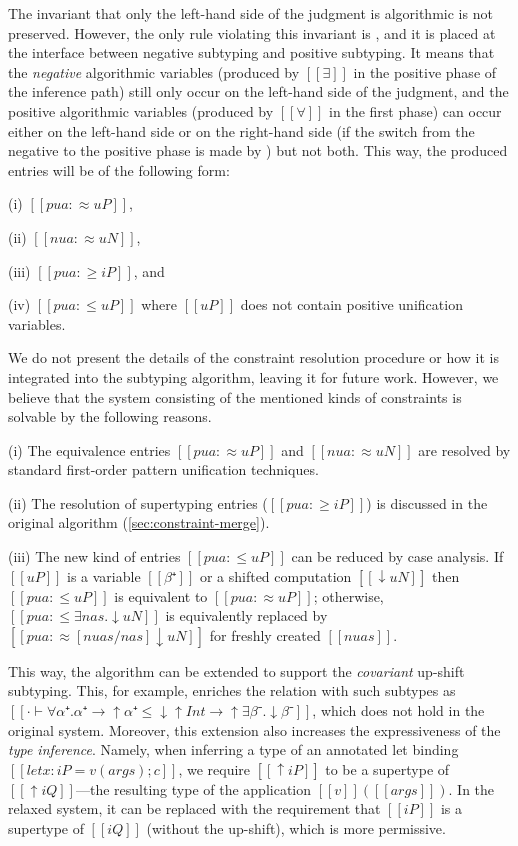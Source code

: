 The invariant that only the left-hand side of the judgment is algorithmic is not
preserved. However, the only rule violating this invariant is
, and it is placed at the interface between
negative subtyping and positive subtyping. It means that the \emph{negative}
algorithmic variables (produced by $[[∃]]$ in the positive phase of the
inference path) still only occur on the left-hand side of the judgment, and the
positive algorithmic variables (produced by $[[∀]]$ in the first phase) can
occur either on the left-hand side or on the right-hand side (if the switch from
the negative to the positive phase is made by )
but not both.
This way, the produced entries will be of the following form:
\begin{itemize*}
    \item[(i)] $[[pua :≈ uP]]$, 
    \item[(ii)] $[[nua :≈ uN]]$, 
    \item[(iii)] $[[pua :≥ iP]]$, and
    \item[(iv)] $[[pua :≤ uP]]$ where $[[uP]]$ does not contain positive unification variables.
\end{itemize*}

We do not present the details of the constraint resolution procedure or how it
is integrated into the subtyping algorithm, leaving it for future work. However,
we believe that the system consisting of the mentioned kinds of constraints is solvable
by the following reasons.
\begin{enumerate*}
    \item[(i)] The equivalence entries $[[pua :≈ uP]]$ and $[[nua :≈ uN]]$ are resolved by standard first-order pattern unification techniques.
    \item[(ii)] The resolution of supertyping entries ($[[pua :≥ iP]]$) is discussed in the original algorithm (\cref{sec:constraint-merge}).
    \item[(iii)] The new kind of entries $[[pua :≤ uP]]$ can be
        reduced by case analysis. If $[[uP]]$ is a variable $[[β⁺]]$
        or a shifted computation $[[↓uN]]$ then 
        $[[pua :≤ uP]]$ is equivalent to $[[pua :≈ uP]]$;
        otherwise, $[[pua :≤ ∃nas.↓uN]]$ is equivalently replaced by $[[pua :≈ [nuas/nas]↓uN]]$
        for freshly created $[[nuas]]$.
\end{enumerate*}

This way, the algorithm can be extended to support the \emph{covariant} up-shift
subtyping. This, for example, enriches the relation with such subtypes as $[[· ⊢
∀α⁺.α⁺→↑α⁺ ≤ ↓↑Int → ↑∃β⁻.↓β⁻]]$, which does not hold in the original system.
Moreover, this extension also increases the expressiveness of the \emph{type
inference}. Namely, when inferring a type of an annotated let binding $[[let
x:iP = v(args); c]]$, we require $[[↑iP]]$ to be a supertype of $[[↑iQ]]$---the
resulting type of the application $[[v]]([[args]])$. In the relaxed system, it
can be replaced with the requirement that $[[iP]]$ is a supertype of $[[iQ]]$
(without the up-shift), which is more permissive.

